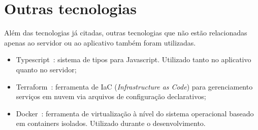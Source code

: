 \FloatBarrier

\section{Outras tecnologias}

Além das tecnologias já citadas, outras tecnologias que não estão relacionadas apenas ao servidor ou ao aplicativo também foram utilizadas.

\begin{itemize}
	\item Typescript~\cite{typescript}: sistema de tipos para Javascript. Utilizado tanto  no aplicativo quanto no servidor;
	\item Terraform~\cite{terraform}: ferramenta de IaC (\emph{Infrastructure as Code}) para gerenciamento serviços em nuvem via arquivos de configuração declarativos;
	\item Docker~\cite{docker}: ferramenta de virtualização à nível do sistema operacional baseado em containers isolados. Utilizado durante o desenvolvimento.
\end{itemize}
